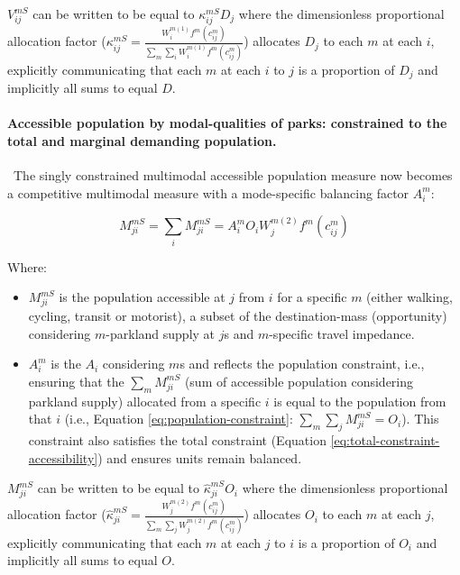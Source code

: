 \documentclass[
11pt, %
oneside, %
english, %
singlespacing, %
]{macthesis} %
\def\tightlist{}
\begin{document}
\(V_{ij}^{mS}\) can be written to be equal to \(\kappa_{ij}^{mS} D_j\) where the dimensionless proportional allocation factor (\(\kappa_{ij}^{mS} = \frac{W_i^{m(1)} f^m(c^m_{ij})}{\sum_m\sum_i W_i^{m(1)} f^m(c^m_{ij})}\)) allocates \(D_j\) to each \(m\) at each \(i\), explicitly communicating that each \(m\) at each \(i\) to \(j\) is a proportion of \(D_j\) and implicitly all sums to equal \(D\).

\paragraph{Accessible population by modal-qualities of parks: constrained to the total and marginal demanding population.}\label{accessible-population-by-modal-qualities-of-parks-constrained-to-the-total-and-marginal-demanding-population.}

~The singly constrained multimodal accessible population measure now becomes a competitive multimodal measure with a mode-specific balancing factor \(A_i^{m}\):

\begin{equation}
\label{eq:singly-constrained-multimodal-market-park}
M^{mS}_{ji} = \sum_i M^{mS}_{ji} = A_i^{m} O_i W_j^{m(2)} f^m(c^m_{ij})
\end{equation} 

Where:

\begin{itemize}
\tightlist
\item
  \(M^{mS}_{ji}\) is the population accessible at \(j\) from \(i\) for a specific \(m\) (either walking, cycling, transit or motorist), a subset of the destination-mass (opportunity) considering \(m\)-parkland supply at \(j\)s and \(m\)-specific travel impedance.
\item
  \(A_i^{m}\) is the \(A_i\) considering \(m\)s and reflects the population constraint, i.e., ensuring that the \(\sum_m M^{mS}_{ji}\) (sum of accessible population considering parkland supply) allocated from a specific \(i\) is equal to the population from that \(i\) (i.e., Equation \ref{eq:population-constraint}: \(\sum_m \sum_j M^{mS}_{ji} = O_i\)). This constraint also satisfies the total constraint (Equation \ref{eq:total-constraint-accessibility}) and ensures units remain balanced.
\end{itemize}

\(M_{ji}^{mS}\) can be written to be equal to \(\hat \kappa_{ji}^{mS} O_i\) where the dimensionless proportional allocation factor (\(\hat \kappa_{ji}^{mS} =  \frac{W_j^{m(2)} f^m(c^m_{ij})}{\sum_m\sum_j W_j^{m(2)} f^m(c^m_{ij})}\)) allocates \(O_i\) to each \(m\) at each \(j\), explicitly communicating that each \(m\) at each \(j\) to \(i\) is a proportion of \(O_i\) and implicitly all sums to equal \(O\).
\end{document}
